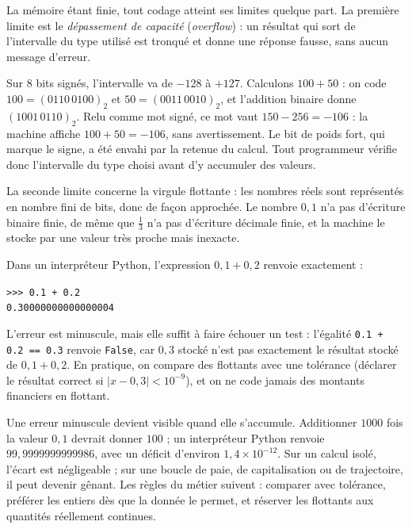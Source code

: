 La mémoire étant finie, tout codage atteint ses limites quelque part. La première limite est le \emph{dépassement de capacité} (\emph{overflow}) : un résultat qui sort de l'intervalle du type utilisé est tronqué et donne une réponse fausse, sans aucun message d'erreur.

\begin{exemple}
Sur 8 bits signés, l'intervalle va de $-128$ à $+127$. Calculons $100 + 50$ : on code $100 = (0110\,0100)_2$ et $50 = (0011\,0010)_2$, et l'addition binaire donne $(1001\,0110)_2$. Relu comme mot signé, ce mot vaut $150 - 256 = -106$ : la machine affiche $100 + 50 = -106$, sans avertissement. Le bit de poids fort, qui marque le signe, a été envahi par la retenue du calcul. Tout programmeur vérifie donc l'intervalle du type choisi avant d'y accumuler des valeurs.
\end{exemple}

La seconde limite concerne la virgule flottante : les nombres réels sont représentés en nombre fini de bits, donc de façon approchée. Le nombre $0{,}1$ n'a pas d'écriture binaire finie, de même que $\tfrac{1}{3}$ n'a pas d'écriture décimale finie, et la machine le stocke par une valeur très proche mais inexacte.

\begin{exemple}
Dans un interpréteur Python, l'expression $0{,}1 + 0{,}2$ renvoie exactement :
\begin{center}
\texttt{>>> 0.1 + 0.2}\\
\texttt{0.30000000000000004}
\end{center}
L'erreur est minuscule, mais elle suffit à faire échouer un test : l'égalité \texttt{0.1 + 0.2 == 0.3} renvoie \texttt{False}, car $0{,}3$ stocké n'est pas exactement le résultat stocké de $0{,}1 + 0{,}2$. En pratique, on compare des flottants avec une tolérance (déclarer le résultat correct si $|x - 0{,}3| < 10^{-9}$), et on ne code jamais des montants financiers en flottant.
\end{exemple}

\begin{remarque}
Une erreur minuscule devient visible quand elle s'accumule. Additionner $1000$ fois la valeur $0{,}1$ devrait donner $100$ ; un interpréteur Python renvoie $99{,}9999999999986$, avec un déficit d'environ $1{,}4 \times 10^{-12}$. Sur un calcul isolé, l'écart est négligeable ; sur une boucle de paie, de capitalisation ou de trajectoire, il peut devenir gênant. Les règles du métier suivent : comparer avec tolérance, préférer les entiers dès que la donnée le permet, et réserver les flottants aux quantités réellement continues.
\end{remarque}

